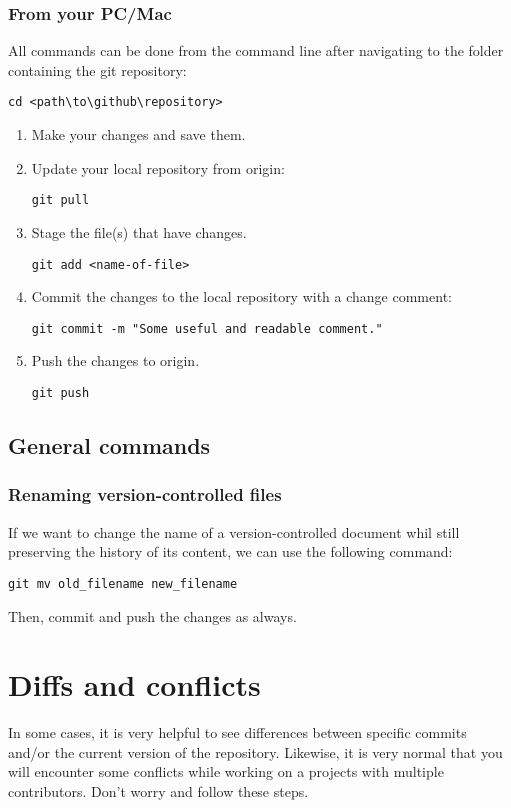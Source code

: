 \documentclass{report}
\begin{document}
\subsection{From your PC/Mac}
All commands can be done from the command line after navigating to the folder containing the git repository:
\begin{verbatim}
cd <path\to\github\repository>
\end{verbatim}

\begin{enumerate}[noitemsep]
    \item Make your changes and save them.
    \item Update your local repository from origin:
    \begin{verbatim}
git pull   
    \end{verbatim}
    \item Stage the file(s) that have changes.
    \begin{verbatim}
git add <name-of-file>
    \end{verbatim}
    \item Commit the changes to the local repository with a change comment:
    \begin{verbatim}
git commit -m "Some useful and readable comment."
    \end{verbatim}
    \item Push the changes to origin.
    \begin{verbatim}
git push
    \end{verbatim}
\end{enumerate}

\section{General commands}

\subsection{Renaming version-controlled files}
If we want to change the name of a version-controlled document whil still preserving the history of its content, we can use the following command:
\begin{verbatim}
git mv old_filename new_filename
\end{verbatim}
Then, commit and push the changes as always.


\chapter{Diffs and conflicts}
In some cases, it is very helpful to see differences between specific commits and/or the current version of the repository.
Likewise, it is very normal that you will encounter some conflicts while working on a projects with multiple contributors. Don't worry and follow these steps.
\end{document}
